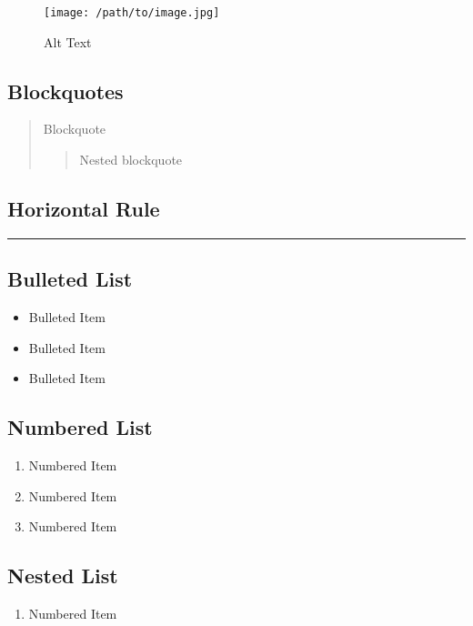 \begin{figure}[htbp]
\centering
\texttt{[image: /path/to/image.jpg]}
\caption{Alt Text}
\end{figure}

\subsection{Blockquotes}

\begin{quote}
Blockquote
\begin{quote}
Nested blockquote
\end{quote}
\end{quote}

\subsection{Horizontal Rule}

\hrule

\subsection{Bulleted List}

\begin{itemize}
\item
  Bulleted Item
\item
  Bulleted Item
\item
  Bulleted Item
\end{itemize}

\subsection{Numbered List}

\begin{enumerate}
\def\labelenumi{\arabic{enumi}.}
\item
  Numbered Item
\item
  Numbered Item
\item
  Numbered Item
\end{enumerate}

\subsection{Nested List}

\begin{enumerate}
\def\labelenumi{\arabic{enumi}.}
\item
  Numbered Item
\end{enumerate}

